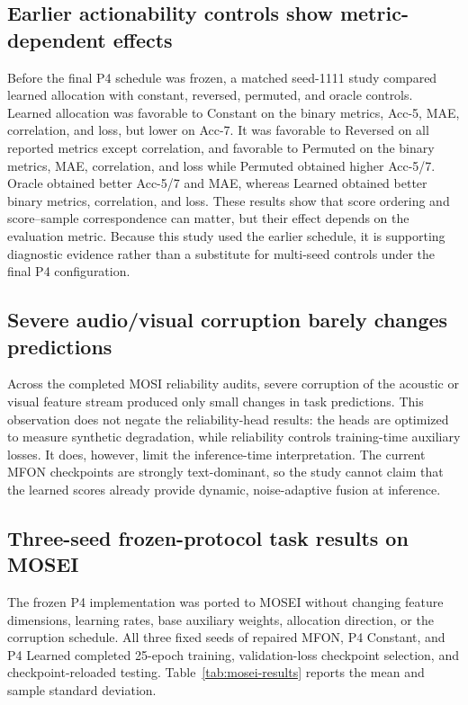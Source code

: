 \subsection{Earlier actionability controls show metric-dependent
effects}\label{earlier-actionability-controls-show-metric-dependent-effects}

Before the final P4 schedule was frozen, a matched seed-1111 study
compared learned allocation with constant, reversed, permuted, and
oracle controls. Learned allocation was favorable to Constant on the
binary metrics, Acc-5, MAE, correlation, and loss, but lower on Acc-7.
It was favorable to Reversed on all reported metrics except correlation,
and favorable to Permuted on the binary metrics, MAE, correlation, and
loss while Permuted obtained higher Acc-5/7. Oracle obtained better
Acc-5/7 and MAE, whereas Learned obtained better binary metrics,
correlation, and loss. These results show that score ordering and
score--sample correspondence can matter, but their effect depends on the
evaluation metric. Because this study used the earlier schedule, it is
supporting diagnostic evidence rather than a substitute for multi-seed
controls under the final P4 configuration.

\subsection{Severe audio/visual corruption barely changes
predictions}\label{severe-audiovisual-corruption-barely-changes-predictions}

Across the completed MOSI reliability audits, severe corruption of the
acoustic or visual feature stream produced only small changes in task
predictions. This observation does not negate the reliability-head
results: the heads are optimized to measure synthetic degradation, while
reliability controls training-time auxiliary losses. It does, however,
limit the inference-time interpretation. The current MFON checkpoints
are strongly text-dominant, so the study cannot claim that the learned
scores already provide dynamic, noise-adaptive fusion at inference.

\subsection{Three-seed frozen-protocol task results on
MOSEI}\label{mosei-frozen-protocol-results}

The frozen P4 implementation was ported to MOSEI without changing feature
dimensions, learning rates, base auxiliary weights, allocation direction, or
the corruption schedule. All three fixed seeds of repaired MFON, P4
Constant, and P4 Learned completed 25-epoch training, validation-loss
checkpoint selection, and checkpoint-reloaded testing.
Table~\ref{tab:mosei-results} reports the mean and sample standard deviation.

